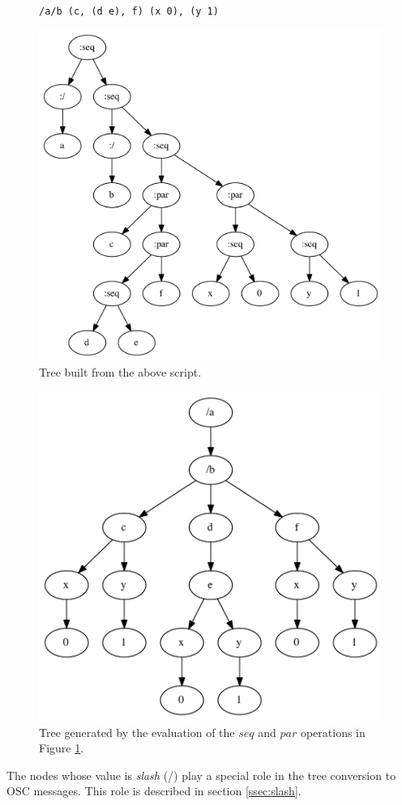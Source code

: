 \documentclass{article}
\newcommand{\code}	[2][0.9]		{\vspace{0mm}\begin{center}\colorbox{mygrey}{
							\begin{minipage}[t]{#1\columnwidth} 
							{\small \texttt{#2}}
							\end{minipage}}\end{center}}
\begin{document}
\begin{figure}[htbp]
\code{/a/b (c, (d e), f) (x 0), (y 1)}
\begin{center}
\includegraphics[width=0.7\columnwidth]{parse/sample1}
\caption{Tree built from the above script.}
\label{parsesample1}
\end{center}
\end{figure}

\begin{figure}[htbp]
\begin{center}
\includegraphics[width=0.6\columnwidth]{eval/sample1}
\caption{Tree generated by the evaluation of the $seq$ and $par$ operations in Figure \ref{parsesample1}.}
\label{treesample1}
\end{center}
\end{figure}

The nodes whose value is \emph{slash} (/) play a special role in the tree conversion to OSC messages. This role is described in section \ref{ssec:slash}.
\end{document}
